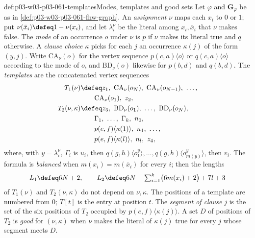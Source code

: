 \begin{hbdefinition}{def:p03-w03-p03-061-templates}{Modes, templates and good sets}
Let \(\varphi\) and \(\mathbf G_\varphi\) be as in
\cref{def:p03-w03-p03-061-fhw-graph}. An \emph{assignment} \(\nu\) maps each
\(x_i\) to \(0\) or \(1\); put \(\nu(\bar x_i)\defeq1-\nu(x_i)\), and let
\(\lambda^\nu_i\) be the literal among \(x_i,\bar x_i\) that \(\nu\) makes
false. The \emph{mode} of an occurrence \(o\) under \(\nu\) is \(p\) if
\(\nu\) makes its literal true and \(q\) otherwise. A \emph{clause choice}
\(\kappa\) picks for each \(j\) an occurrence \(\kappa(j)\) of the form
\((y,j)\). Write \(\mathrm{CA}_\nu(o)\) for the vertex sequence
\(p(c,a)\langle o\rangle\) or \(q(c,a)\langle o\rangle\) according to the
mode of \(o\), and \(\mathrm{BD}_\nu(o)\) likewise for \(p(b,d)\) and
\(q(b,d)\). The \emph{templates} are the concatenated vertex sequences
\[
\begin{aligned}
 T_1(\nu)&\defeq z_1,\ \mathrm{CA}_\nu(o_N),\ \mathrm{CA}_\nu(o_{N-1}),\ \ldots,\\
 &\qquad\mathrm{CA}_\nu(o_1),\ z_2,\\
 T_2(\nu,\kappa)&\defeq z_3,\ \mathrm{BD}_\nu(o_1),\ \ldots,\ \mathrm{BD}_\nu(o_N),\\
 &\qquad\Gamma_1,\ \ldots,\ \Gamma_k,\ n_0,\\
 &\qquad p(e,f)\langle\kappa(1)\rangle,\ n_1,\ \ldots,\\
 &\qquad p(e,f)\langle\kappa(l)\rangle,\ n_l,\ z_4,
\end{aligned}
\]
where, with \(y=\lambda^\nu_i\), \(\Gamma_i\) is \(u_i\), then
\(q(g,h)\langle o^y_1\rangle,\ldots,q(g,h)\langle o^y_{m(y)}\rangle\), then
\(v_i\). The formula is \emph{balanced} when \(m(x_i)=m(\bar x_i)\) for every
\(i\); then the lengths
\[
 L_1\defeq6N+2,\qquad
 L_2\defeq6N+\textstyle\sum_{i=1}^k\bigl(6m(x_i)+2\bigr)+7l+3
\]
of \(T_1(\nu)\) and \(T_2(\nu,\kappa)\) do not depend on \(\nu,\kappa\). The
positions of a template are numbered from \(0\); \(T[t]\) is the entry at
position \(t\). The \emph{segment of clause} \(j\) is the set of the six
positions of \(T_2\) occupied by \(p(e,f)\langle\kappa(j)\rangle\). A set
\(D\) of positions of \(T_2\) is \emph{good} for \((\nu,\kappa)\) when
\(\nu\) makes the literal of \(\kappa(j)\) true for every \(j\) whose segment
meets \(D\).
\end{hbdefinition}

